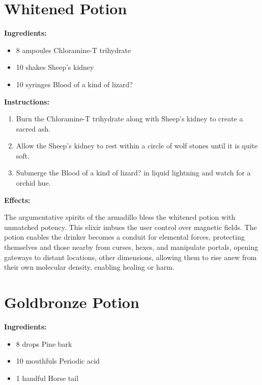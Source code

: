 \documentclass{article}
\begin{document}
\newpage
\section*{Whitened Potion}

\textbf{Ingredients:}

\begin{itemize}
  \item 8 ampoules Chloramine-T trihydrate
  \item 10 shakes Sheep's kidney
  \item 10 syringes Blood of a kind of lizard?
\end{itemize}

\textbf{Instructions:}

\begin{enumerate}
  \item Burn the Chloramine-T trihydrate along with Sheep's kidney to create a sacred ash.
  \item Allow the Sheep's kidney to rest within a circle of wolf stones until it is quite soft.
  \item Submerge the Blood of a kind of lizard? in liquid lightning and watch for a orchid hue.
\end{enumerate}

\textbf{Effects:}

The argumentative spirits of the armadillo bless the whitened potion with unmatched potency. This elixir imbues the user control over magnetic fields. The potion enables the drinker becomes a conduit for elemental forces, protecting themselves and those nearby from curses, hexes, and manipulate portals, opening gateways to distant locations, other dimensions, allowing them to rise anew from their own molecular density, enabling healing or harm.

\newpage
\section*{Goldbronze Potion}

\textbf{Ingredients:}

\begin{itemize}
  \item 8 drops Pine bark
  \item 10 mouthfuls Periodic acid
  \item 1 handful Horse tail
\end{itemize}
\end{document}
